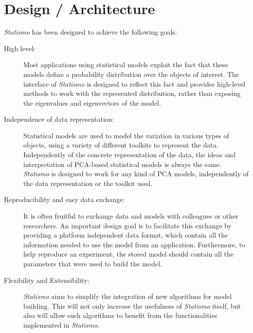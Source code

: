 \documentclass{InsightArticle}
\newcommand{\Statismo}{\emph{Statismo}\xspace}
\begin{document}
\section{Design / Architecture}
\Statismo has been designed to achieve the following goals:
\begin{description}
\item[High level:] Most applications using statistical models exploit the
  fact that these models define a probability distribution over the objects of interest. 
  The interface of \Statismo is designed to reflect this fact and provides
  high-level methods to work with the represented distribution, rather than 
  exposing the eigenvalues and eigenvectors of the model. 
\item[Independence of data representation:] 
  Statistical models are used to model the variation in various types of objects, using a variety of 
  different toolkits to represent the data. Independently of the concrete representation of the data, 
  the ideas and interpretation of PCA-based  statistical models is always the same. 
  \Statismo is designed to work for any kind of PCA models, independently of the data representation or the toolkit used. 
\item[Reproducibility and easy data exchange:] 
  It is often fruitful to exchange data and models with colleagues or other researchers. 
  An important design goal is to facilitate this exchange by providing a platform independent data format, 
  which contain all the information needed to use the model from an application. 
  Furthermore, to help reproduce an experiment, the stored model should contain all the parameters
  that were used to build the model. 
\item[Flexibility and Extensibility:] 
  \Statismo aims to simplify the integration of new algorithms for model building. 
  This will not only increase the usefulness of \Statismo itself, but also will 
  allow such algorithms to benefit from the functionalities implemented in \Statismo. 
\end{description}
\end{document}

